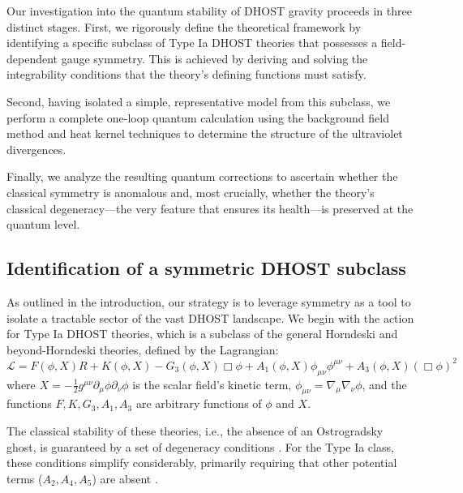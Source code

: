 \documentclass[twocolumn]{aastex631}
\begin{document}
Our investigation into the quantum stability of DHOST gravity proceeds in three distinct stages. First, we rigorously define the theoretical framework by identifying a specific subclass of Type Ia DHOST theories that possesses a field-dependent gauge symmetry. This is achieved by deriving and solving the integrability conditions that the theory's defining functions must satisfy.

Second, having isolated a simple, representative model from this subclass, we perform a complete one-loop quantum calculation using the background field method and heat kernel techniques to determine the structure of the ultraviolet divergences.

Finally, we analyze the resulting quantum corrections to ascertain whether the classical symmetry is anomalous and, most crucially, whether the theory's classical degeneracy---the very feature that ensures its health---is preserved at the quantum level.

\subsection{Identification of a symmetric DHOST subclass}
As outlined in the introduction, our strategy is to leverage symmetry as a tool to isolate a tractable sector of the vast DHOST landscape. We begin with the action for Type Ia DHOST theories, which is a subclass of the general Horndeski and beyond-Horndeski theories, defined by the Lagrangian:
\begin{equation}\mathcal{L} = F(\phi, X) R + K(\phi, X) - G_3(\phi, X) \Box\phi + A_1(\phi, X) \phi_{\mu\nu}\phi^{\mu\nu} + A_3(\phi, X) (\Box\phi)^2\end{equation}
where $X = - \frac{1}{2} g^{\mu\nu} \partial_\mu \phi \partial_\nu \phi$ is the scalar field's kinetic term, $\phi_{\mu\nu} = \nabla_\mu \nabla_\nu \phi$, and the functions $F, K, G_3, A_1, A_3$ are arbitrary functions of $\phi$ and $X$.

The classical stability of these theories, i.e., the absence of an Ostrogradsky ghost, is guaranteed by a set of degeneracy conditions \citep{crisostomi2017higherderivativefieldtheories,crisostomi2017higherderivativefieldtheories}. For the Type Ia class, these conditions simplify considerably, primarily requiring that other potential terms ($A_2, A_4, A_5$) are absent \citep{nezhad2025degeneratehigherorderscalartensortheories}.
\end{document}
